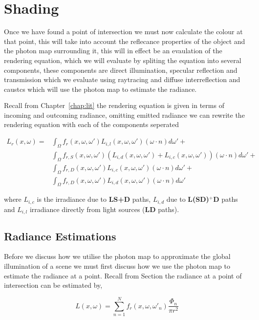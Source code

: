 \section{Shading}
Once we have found a point of intersection we must now calculate the colour at that point, this will take into account the
reflecance properties of the object and the photon map surrounding it, this will in effect be an evaulation of the rendering
equation, which we will evaluate by spliting the equation into several components, these components are direct illumination,
specular reflection and transmission which we evaluate using raytracing and diffuse interreflection and caustcs which will
use the photon map to estimate the radiance.

Recall from Chapter~\ref{chap:lit}  the rendering equation is given in terms of incoming and outcoming radiance, omitting
emitted radiance we can rewrite the rendering equation with each of the components seperated \cite{JensenBook}

\begin{align*}
L_{r}(x, \omega) =&
			\int_{\Omega}
				f_{r}(x, \omega, \omega')
				L_{i,l}(x,\omega,\omega')
				(\omega \cdot n)d\omega'
			+\\
		&	\int_{\Omega}
				f_{r,S}(x, \omega, \omega')
				(
				L_{i,d}(x,\omega,\omega')
				+
				L_{i,c}(x,\omega,\omega')
				)
				(\omega \cdot n)d\omega'
			+\\
		&	\int_{\Omega}
				f_{r,D}(x, \omega, \omega')
				L_{i,c}(x,\omega,\omega')
				(\omega \cdot n)d\omega'
			+\\
		&	\int_{\Omega}
				f_{r,D}(x, \omega, \omega')
				L_{i,d}(x,\omega,\omega')
				(\omega \cdot n)d\omega'
\end{align*}

where $L_{i,c}$ is the irradiance due to \textbf{LS+D} paths, $L_{i,d}$ due to \textbf{L(S\textbar D)$^+$D} paths and $L_{i,l}$
irradiance directly from light sources (\textbf{LD} paths).

\subsection{Radiance Estimations}
Before we discuss how we utilise the photon map to approximate the global illumination of a scene we must first discuss how
we use the photon map to estimate the radiance at a point. Recall from Section  the radiance at a point
of intersection can be estimated by,

\begin{equation}
L(x, \omega) = \sum\limits_{n = 1}^N f_r(x,\omega,\omega'_n) \frac{\Phi_n}{\pi r ^ 2}
\end{equation}

